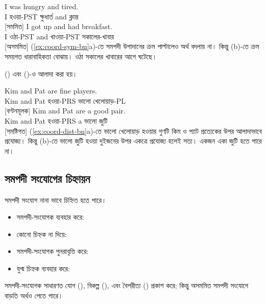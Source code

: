 \ea \label{ex:coord-sym-bn}
    \ea \gll I was hungry and tired.\\
        I হওয়া-PST ক্ষুধার্ত and ক্লান্ত\\
    \glt {} [সমমিত]
    \ex \gll I got up and had breakfast.\\
        I ওঠা-PST and খাওয়া-PST সকালের-খাবার\\
    \glt {} [অসমমিত]
    \z
\z
(\ref{ex:coord-sym-bn}a)-তে সমপদী উপাদানের ক্রম পাল্টালেও অর্থ বদলায় না। কিন্তু (b)-তে ক্রম সময়গত ধারাবাহিকতা বোঝায়। ওঠা সকালের খাবারের আগে ঘটেছে।

 () এবং  ()-ও আলাদা করা হয়।

\ea \label{ex:coord-dist-bn}
    \ea \gll Kim and Pat are fine players.\\
        Kim and Pat হওয়া-PRS ভালো খেলোয়াড়-PL\\
    \glt {} [বণ্টনমূলক]
    \ex \gll Kim and Pat are a good pair.\\
        Kim and Pat হওয়া-PRS a ভালো জুটি\\
    \glt {} [সমষ্টিগত]
    \z
\z
(\ref{ex:coord-dist-bn}a)-তে ভালো খেলোয়াড় হওয়ার গুণটি কিম ও প্যাট প্রত্যেকের উপর আলাদাভাবে প্রযোজ্য। কিন্তু (b)-তে ভালো জুটি হওয়া দুইজনের উপর একত্রে প্রযোজ্য হলেই সত্য। একজন একা জুটি হতে পারে না।

\subsection{সমপদী সংযোগের চিহ্নায়ন}

সমপদী সংযোগ নানা ভাবে চিহ্নিত হতে পারে।
\begin{itemize}[noitemsep]
    \item সমপদী-সংযোগক ব্যবহার করে: 
    \item কোনো চিহ্নক না দিয়ে: 
    \item সমপদী-সংযোগক পুনরাবৃত্তি করে: 
    \item যুগ্ম চিহ্নক ব্যবহার করে: 
\end{itemize}

সমপদী-সংযোগক সাধারণত যোগ (), বিকল্প (), এবং বৈপরীত্য () প্রকাশ করে; কিন্তু অসমমিত সমপদী সংযোগে বাড়তি অর্থও পেতে পারে।

